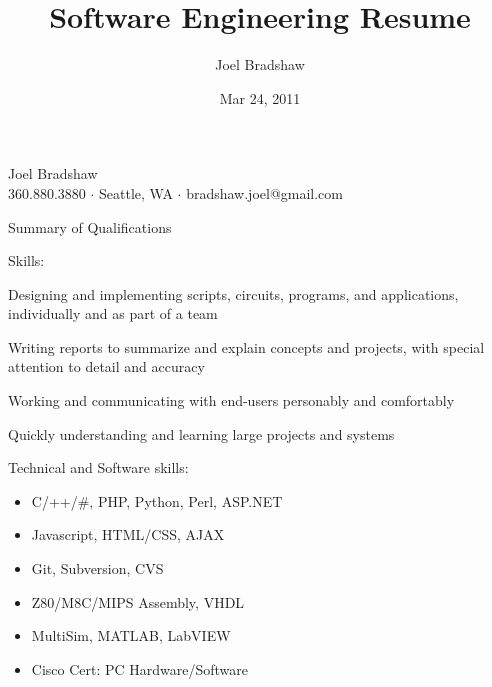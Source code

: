 \documentclass[letterpaper,10pt]{article}
\newenvironment{res_section}[1]{%
  \vskip 6pt
  \noindent
  {\Large \textbf{#1}}\\
  \rule[8pt]{\textwidth}{0.5pt}
  \vskip -8pt
}{
}
\newenvironment{res_subsection}[1]{%
  \vskip 4pt
  \noindent
  \textbf{\large{#1}}
  \begin{itemize}
}{
  \end{itemize}
}
\begin{document}
\title{Software Engineering Resume}
\author{Joel Bradshaw}
\date{Mar 24, 2011}
\begin{center}
{\Huge Joel Bradshaw}\\
\vskip 2pt
{\large 360.880.3880 \ensuremath{\cdot} Seattle, WA \ensuremath{\cdot} bradshaw.joel@gmail.com}
\end{center}
\vskip -8pt
\begin{res_section}{Summary of Qualifications}
\begin{res_subsection}{Skills:}
  \item Designing and implementing scripts, circuits, programs, and applications, individually and as part of a team
  \item Writing reports to summarize and explain concepts and projects, with special attention to detail and accuracy
  \item Working and communicating with end-users personably and comfortably
  \item Quickly understanding and learning large projects and systems
  \item Technical and Software skills:
  \def \multicolsep {0pt}
  \setlength{\columnsep}{-8pt}
  \begin{multicols}{3}
  \begin{itemize}
    \item C/++/\#, PHP, Python, Perl, ASP.NET
    \item Javascript, HTML/CSS, AJAX
    \item Git, Subversion, CVS
    \item Z80/M8C/MIPS Assembly, VHDL
    \item MultiSim, MATLAB, LabVIEW
    \item Cisco Cert: PC Hardware/Software
  \end{itemize}
  \end{multicols}
\end{res_subsection}
\end{res_section}
\end{document}
